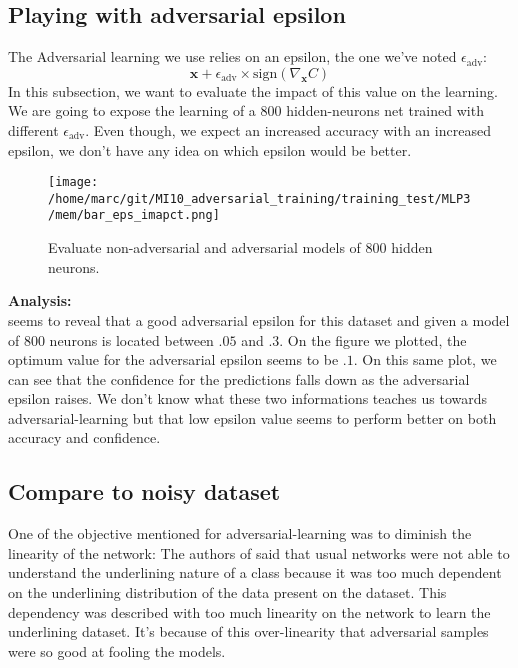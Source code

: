 		\subsection{Playing with adversarial epsilon}
		\label{ssub:playing_with_adversarial_epsilon}
			The Adversarial learning we use relies on an epsilon, the one we've noted $\epsilon_{\text{adv}}$:
			$$ \boldsymbol{x} + \epsilon_{\text{adv}} \times \text{sign}(\nabla_{\boldsymbol{x}} C) $$
			In this subsection, we want to evaluate the impact of this value on the learning. We are going to expose the learning of a 800 hidden-neurons net trained with different $\epsilon_{\text{adv}}$. Even though, we expect an increased accuracy with an increased epsilon, we don't have any idea on which epsilon would be better. 

			\begin{figure}
				\centering
				\texttt{[image: /home/marc/git/MI10\_adversarial\_training/training\_test/MLP3/mem/bar\_eps\_imapct.png]}
				\caption{Evaluate non-adversarial and adversarial models of 800 hidden neurons.}
				\label{fig:mnist_adv_eps}
			\end{figure}
			
			\vskip 1cm
			\textbf{Analysis:}\\
			 seems to reveal that a good adversarial epsilon for this dataset and given a model of 800 neurons is located between $.05$ and $.3$. On the figure we plotted, the optimum value for the adversarial epsilon seems to be $.1$. On this same plot, we can see that the confidence for the predictions falls down as the adversarial epsilon raises. We don't know what these two informations teaches us towards adversarial-learning but that low epsilon value seems to perform better on both accuracy and confidence.


		\subsection{Compare to noisy dataset} 
		\label{ssub:compare_to_noisy_dataset}
			One of the objective mentioned for adversarial-learning was to diminish the linearity of the network: The authors of \cite{goodfellow2014explaining} said that usual networks were not able to understand the underlining nature of a class because it was too much dependent on the underlining distribution of the data present on the dataset. This dependency was described with too much linearity on the network to learn the underlining dataset. It's because of this over-linearity that adversarial samples were so good at fooling the models.

